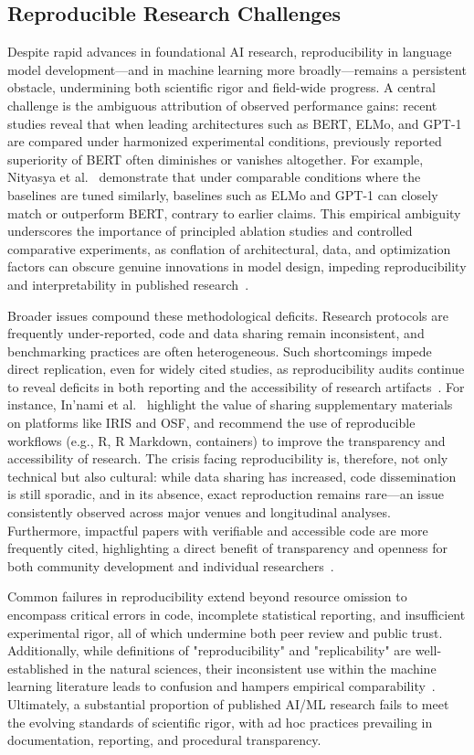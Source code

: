 \documentclass[sigconf]{acmart}
\begin{document}
\subsection{Reproducible Research Challenges}

Despite rapid advances in foundational AI research, reproducibility in language model development—and in machine learning more broadly—remains a persistent obstacle, undermining both scientific rigor and field-wide progress. A central challenge is the ambiguous attribution of observed performance gains: recent studies reveal that when leading architectures such as BERT, ELMo, and GPT-1 are compared under harmonized experimental conditions, previously reported superiority of BERT often diminishes or vanishes altogether. For example, Nityasya et al.~\cite{ref107} demonstrate that under comparable conditions where the baselines are tuned similarly, baselines such as ELMo and GPT-1 can closely match or outperform BERT, contrary to earlier claims. This empirical ambiguity underscores the importance of principled ablation studies and controlled comparative experiments, as conflation of architectural, data, and optimization factors can obscure genuine innovations in model design, impeding reproducibility and interpretability in published research~\cite{ref107}.

Broader issues compound these methodological deficits. Research protocols are frequently under-reported, code and data sharing remain inconsistent, and benchmarking practices are often heterogeneous. Such shortcomings impede direct replication, even for widely cited studies, as reproducibility audits continue to reveal deficits in both reporting and the accessibility of research artifacts~\cite{ref107,ref108}. For instance, In'nami et al.~\cite{ref108} highlight the value of sharing supplementary materials on platforms like IRIS and OSF, and recommend the use of reproducible workflows (e.g., R, R Markdown, containers) to improve the transparency and accessibility of research. The crisis facing reproducibility is, therefore, not only technical but also cultural: while data sharing has increased, code dissemination is still sporadic, and in its absence, exact reproduction remains rare—an issue consistently observed across major venues and longitudinal analyses. Furthermore, impactful papers with verifiable and accessible code are more frequently cited, highlighting a direct benefit of transparency and openness for both community development and individual researchers~\cite{ref108}.

Common failures in reproducibility extend beyond resource omission to encompass critical errors in code, incomplete statistical reporting, and insufficient experimental rigor, all of which undermine both peer review and public trust. Additionally, while definitions of "reproducibility" and "replicability" are well-established in the natural sciences, their inconsistent use within the machine learning literature leads to confusion and hampers empirical comparability~\cite{ref108}. Ultimately, a substantial proportion of published AI/ML research fails to meet the evolving standards of scientific rigor, with ad hoc practices prevailing in documentation, reporting, and procedural transparency.
\end{document}
